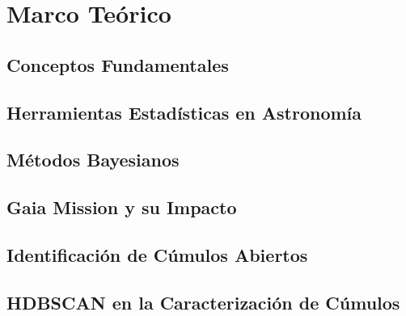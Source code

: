 \documentclass[../Main.tex]{subfiles}
\begin{document}
\section{Marco Teórico}

\subsection{Conceptos Fundamentales}
\lipsum[1] %

\subsection{Herramientas Estadísticas en Astronomía}
\lipsum[2] %

\subsection{Métodos Bayesianos}
\lipsum[3] %

\subsection{Gaia Mission y su Impacto}
\lipsum[4] %

\subsection{Identificación de Cúmulos Abiertos}
\lipsum[5] %

\subsection{HDBSCAN en la Caracterización de Cúmulos}
\lipsum[6] %

\biblio 
\end{document}
